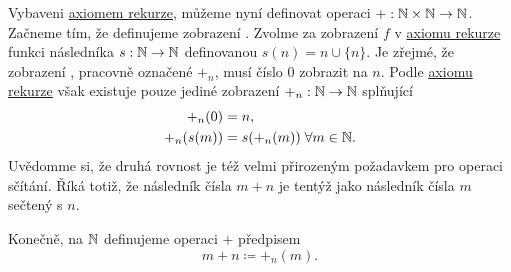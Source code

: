 Vybaveni \hyperref[prop:axiom-rekurze]{axiomem rekurze}, můžeme nyní definovat
operaci $+:\mathbb{N} \times \mathbb{N} \to \mathbb{N}$. Začneme tím, že definujeme zobrazení . Zvolme za zobrazení $f$ v \hyperref[prop:axiom-rekurze]{axiomu rekurze}
funkci následníka ${s:\mathbb{N} \to \mathbb{N}}$ definovanou $s(n) = n \cup \{n\}$. Je zřejmé,
že zobrazení , pracovně označené $+_n$, musí číslo $0$ zobrazit
na $n$. Podle \hyperref[prop:axiom-rekurze]{axiomu rekurze} však existuje pouze
jediné zobrazení $+_n:\mathbb{N} \to \mathbb{N}$ splňující
\begin{align*}
 +_n(0) &= n,\\
 +_n(s(m)) &= s(+_n(m)) \; \forall m \in \mathbb{N}.
\end{align*}
Uvědomme si, že druhá rovnost je též velmi přirozeným požadavkem pro operaci
sčítání. Říká totiž, že následník čísla $m + n$ je tentýž jako následník čísla
$m$ sečtený s $n$.

Konečně, na $\mathbb{N}$ definujeme operaci $+$ předpisem
\[
 m + n \coloneqq +_n(m).
\]

